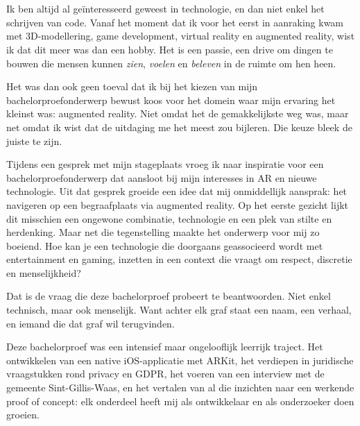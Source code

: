 
\chapter*{}%
\label{ch:voorwoord}

Ik ben altijd al geïnteresseerd geweest in technologie, en dan niet enkel het schrijven van
code. Vanaf het moment dat ik voor het eerst in aanraking kwam met 3D-modellering,
game development, virtual reality en augmented reality, wist ik dat dit meer was
dan een hobby. Het is een passie, een drive om
dingen te bouwen die mensen kunnen \textit{zien}, \textit{voelen} en
\textit{beleven} in de ruimte om hen heen.

Het was dan ook geen toeval dat ik bij het kiezen van mijn bachelorproefonderwerp bewust
koos voor het domein waar mijn ervaring het kleinst was: augmented reality. Niet
omdat het de gemakkelijkste weg was, maar net omdat ik wist dat de uitdaging me
het meest zou bijleren. Die keuze bleek de juiste te zijn.

Tijdens een gesprek met mijn stageplaats vroeg ik naar inspiratie voor een
bachelorproefonderwerp dat aansloot bij mijn interesses in AR en nieuwe technologie.
Uit dat gesprek groeide een idee dat mij onmiddellijk aansprak: het navigeren op
een begraafplaats via augmented reality. Op het eerste gezicht lijkt dit misschien
een ongewone combinatie, technologie en een plek van stilte en herdenking. Maar
net die tegenstelling maakte het onderwerp voor mij zo boeiend. Hoe kan je een
technologie die doorgaans geassocieerd wordt met entertainment en gaming, inzetten
in een context die vraagt om respect, discretie en menselijkheid?

Dat is de vraag die deze bachelorproef probeert te beantwoorden. Niet enkel
technisch, maar ook menselijk. Want achter elk graf staat een naam, een verhaal,
en iemand die dat graf wil terugvinden.

Deze bachelorproef was een intensief maar ongelooflijk leerrijk traject. Het
ontwikkelen van een native iOS-applicatie met ARKit, het verdiepen in juridische
vraagstukken rond privacy en GDPR, het voeren van een interview met de gemeente
Sint-Gillis-Waas, en het vertalen van al die inzichten naar een werkende proof of
concept: elk onderdeel heeft mij als ontwikkelaar en als onderzoeker doen groeien.

